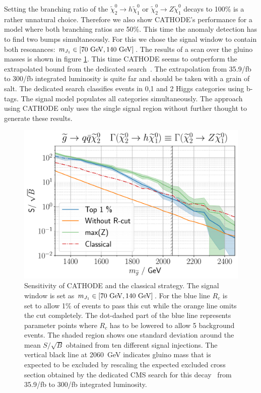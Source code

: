 \documentclass[prd, twocolumn, superscriptaddress,floatfix, nofootinbib, preprintnumbers]{revtex4-2}
\begin{document}
Setting the branching ratio of the $\widetilde{\chi}_2^0 \rightarrow h \widetilde{\chi}_1^0$ or $\widetilde{\chi}_2^0 \rightarrow Z \widetilde{\chi}_1^0$ decays to 100\% is a rather unnatural choice. Therefore we also show CATHODE's performance for a model where both branching ratios are 50\%. This time the anomaly detection has to find two bumps simultaneously. For this we chose the signal window to contain both resonances: $m_{J_1} \in [70~{\rm GeV},140~{\rm GeV}]$. The results of a scan over the gluino masses is shown in figure \ref{fig:HZ}. This time CATHODE seems to outperform the extrapolated bound from the dedicated search~\cite{CMS:2017may}. The extrapolation from 35.9/fb to 300/fb integrated luminosity is quite far and should be taken with a grain of salt. The dedicated search classifies events in 0,1 and 2 Higgs categories using b-tags. The signal model populates all categories simultaneously. The approach using CATHODE only uses the single signal region without further thought to generate these results.
\begin{figure}[b]
\centering
\includegraphics[width=0.9\linewidth]{HH-HZ-ZZ.pdf}
\caption{Sensitivity of CATHODE and the classical strategy. The signal window is set as $m_{J_1} \in [70~{\rm GeV},140~{\rm GeV}]$. For the blue line $R_c$ is set to allow 1\% of events to pass this cut while the orange line omits the cut completely. The dot-dashed part of the blue line represents parameter points where $R_c$ has to be lowered to allow 5 background events. The shaded region shows one standard deviation around the mean $S/\sqrt{B}$ obtained from ten different signal injections. The vertical black line at 2060~GeV  indicates gluino mass that is expected to be excluded by rescaling the expected excluded cross section obtained by the dedicated CMS search for this decay~\cite{CMS:2017may} from 35.9/fb to 300/fb integrated luminosity.}
\label{fig:HZ}
\end{figure}
\end{document}
